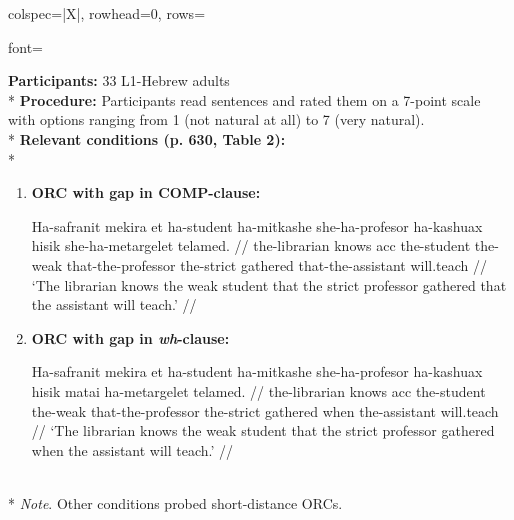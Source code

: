 \begin{longtblr}[caption={\textcite{keshev.meltzer-asscher2019}: Acceptability judgment task (Experiment 1)}, label={tblr:gap-lw-km19}]{colspec={|X|}, rowhead=0, rows={font=\raggedright{}}}\hline
\textbf{Participants:} 33 L1-Hebrew adults \vspace{5pt}\\*
\textbf{Procedure:} Participants read sentences and rated them on a 7-point scale with options ranging from 1 (not natural at all) to 7 (very natural). \vspace{5pt}\\*
\textbf{Relevant conditions (p. 630, Table 2):} \vspace{5pt}\\*
\begin{varwidth}{\linewidth}\begin{enumerate}[\bfseries (a),itemsep=5pt] 
\item \textbf{ORC with gap in COMP-clause:}\par\nobreak\vspace{3pt}
\hspace{0pt}\begin{minipage}{0.9\linewidth}
\begingl
\gla Ha-safranit mekira et ha-student ha-mitkashe she-ha-profesor ha-kashuax hisik she-ha-metargelet telamed. //
\glb the-librarian knows {\sc acc} the-student the-weak that-the-professor the-strict gathered that-the-assistant will.teach //
\glft `The librarian knows the weak student that the strict professor gathered that the assistant will teach.' //
\endgl
\end{minipage}
\item \textbf{ORC with gap in \textit{wh}-clause:}\par\nobreak\vspace{3pt}
\hspace{0pt}\begin{minipage}{0.9\linewidth}
\begingl
\gla Ha-safranit mekira et ha-student ha-mitkashe she-ha-profesor ha-kashuax hisik matai ha-metargelet telamed. //
\glb the-librarian knows {\sc acc} the-student the-weak that-the-professor the-strict gathered when the-assistant will.teach //
\glft `The librarian knows the weak student that the strict professor gathered when the assistant will teach.' //
\endgl
\end{minipage}
\end{enumerate}\end{varwidth}\vspace{5pt}\\*
\textit{Note}. Other conditions probed short-distance ORCs. \\\hline
\end{longtblr}


